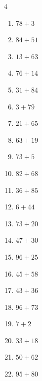 \begin{multicols}{4}
\begin{enumerate}
  \item $78+3$
        \phantom{$=81$}

  \item $84+51$
        \phantom{$=135$}

  \item $13+63$
        \phantom{$=76$}

  \item $76+14$
        \phantom{$=90$}

  \item $31+84$
        \phantom{$=115$}

  \item $3+79$
        \phantom{$=82$}

  \item $21+65$
        \phantom{$=86$}

  \item $63+19$
        \phantom{$=82$}

  \item $73+5$
        \phantom{$=78$}

  \item $82+68$
        \phantom{$=150$}

  \item $36+85$
        \phantom{$=121$}

  \item $6+44$
        \phantom{$=50$}

  \item $73+20$
        \phantom{$=93$}

  \item $47+30$
        \phantom{$=77$}

  \item $96+25$
        \phantom{$=121$}

  \item $45+58$
        \phantom{$=103$}

  \item $43+36$
        \phantom{$=79$}

  \item $96+73$
        \phantom{$=169$}

  \item $7+2$
        \phantom{$=9$}

  \item $33+18$
        \phantom{$=51$}

  \item $50+62$
        \phantom{$=112$}

  \item $95+80$
        \phantom{$=175$}


\end{enumerate}
\end{multicols}
